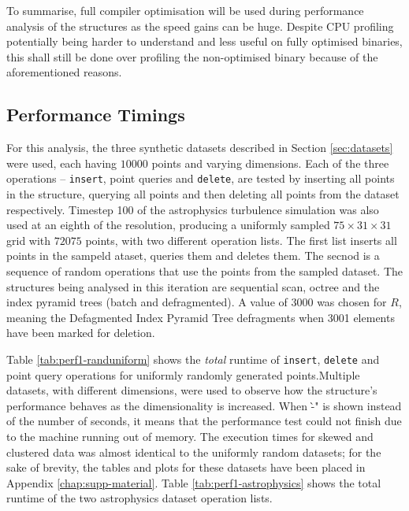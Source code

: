 To summarise, full compiler optimisation will be used during performance analysis of the structures as the speed gains can be huge. Despite CPU profiling potentially being harder to understand and less useful on fully optimised binaries, this shall still be done over profiling the non-optimised binary because of the aforementioned reasons.

\subsection{Performance Timings}

For this analysis, the three synthetic datasets described in Section \ref{sec:datasets} were used, each having $10000$ points and varying dimensions. Each of the three operations -- \texttt{insert}, point queries and \texttt{delete}, are tested by inserting all points in the structure, querying all points and then deleting all points from the dataset respectively. Timestep 100 of the astrophysics turbulence simulation was also used at an eighth of the resolution, producing a uniformly sampled $75 \times 31 \times 31$ grid with $72075$ points, with two different operation lists. The first list inserts all points in the sampeld ataset, queries them and deletes them. The secnod is a sequence of random operations that use the points from the sampled dataset. The structures being analysed in this iteration are sequential scan, octree and the index pyramid trees (batch and defragmented). A value of 3000 was chosen for $R$, meaning the Defagmented Index Pyramid Tree defragments when 3001 elements have been marked for deletion.

Table \ref{tab:perf1-randuniform} shows the \textit{total} runtime of \texttt{insert}, \texttt{delete} and point query operations for uniformly randomly generated points.Multiple datasets, with different dimensions, were used to observe how the structure's performance behaves as the dimensionality is increased.  When \`-" is shown instead of the number of seconds, it means that the performance test could not finish due to the machine running out of memory. The execution times for skewed and clustered data was almost identical to the uniformly random datasets; for the sake of brevity, the tables and plots for these datasets have been placed in Appendix \ref{chap:supp-material}. Table \ref{tab:perf1-astrophysics} shows the total runtime of the two astrophysics dataset operation lists.

